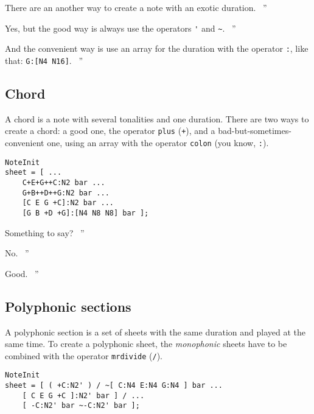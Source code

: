 \documentclass{article}
\newenvironment{meenv}{ \par \noindent \makebox[6em][r]{ \textcolor{mecolor}{Me}: `` --~}}{~''}
\newenvironment{myselfenv}{ \par \noindent \makebox[6em][r]{ \textcolor{myselfcolor}{Myself}: `` --~}}{~''}
\newcommand{ \me }[1]{%
\begin{meenv}%
	#1%
\end{meenv} }
\newcommand{ \myself }[1]{%
\begin{myselfenv}%
	#1%
\end{myselfenv} }
\begin{document}
\me{There are an another way to create a note with an exotic duration.}
\begin{myselfenv}%
	Yes, but the good way is always use the operators \lstinline!'! and \lstinline!~!.%
\end{myselfenv}
\begin{meenv}%
	And the convenient way is use an array for the duration with the operator \lstinline!:!, like that: \lstinline!G:[N4 N16]!.%
\end{meenv}

\subsection{Chord}

A chord is a note with several tonalities and one duration. There are two ways to create a chord: a good one, the operator \lstinline!plus! (\lstinline!+!), and a bad-but-sometimes-convenient one, using an array with the operator \lstinline!colon! (you know, \lstinline!:!). \\

\begin{lstlisting}
NoteInit
sheet = [ ...
	C+E+G++C:N2 bar ...
	G+B++D++G:N2 bar ...
	[C E G +C]:N2 bar ...
	[G B +D +G]:[N4 N8 N8] bar ];
\end{lstlisting}

\myself{Something to say?}
\me{No.}
\myself{Good.}

\subsection{Polyphonic sections}
\label{sec:TutoPolyphonic}

A polyphonic section is a set of sheets with the same duration and played at the same time. To create a polyphonic sheet, the \emph{monophonic} sheets have to be combined with the operator \lstinline!mrdivide! (\lstinline!/!). \\
\begin{lstlisting}
NoteInit
sheet = [ ( +C:N2' ) / ~[ C:N4 E:N4 G:N4 ] bar ...
	[ C E G +C ]:N2' bar ] / ...
	[ -C:N2' bar ~-C:N2' bar ];
\end{lstlisting}
\end{document}
